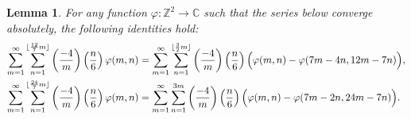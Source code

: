 \documentclass[11pt,reqno]{amsart}
\newtheorem{lemma}[theorem]{Lemma}
\renewcommand{\=}{\;=\;}
\theoremstyle{myremark}
\begin{document}
\begin{lemma} \label{lem:double_ser_trans}
For any function $\varphi:\mathbb{Z}^2 \rightarrow \mathbb{C}$ such that the series below converge absolutely, the following identities hold:
\begin{align}
\sum_{m=1}^\infty \sum_{n=1}^{\lfloor {12 \over 7}m \rfloor} \left({-4 \over m}\right) \left({n \over 6}\right) \varphi(m,n) &= \sum_{m=1}^\infty \sum_{n=1}^{\lfloor {3 \over 2}m \rfloor} \left({-4 \over m}\right) \left({n \over 6}\right) \Big( \varphi(m,n) - \varphi(7m-4n,12m-7n) \Big), \label{eqn:double_ser_trans1} \\
\sum_{m=1}^\infty \sum_{n=1}^{\lfloor {24 \over 7}m \rfloor} \left({-4 \over m}\right) \left({n \over 6}\right) \varphi(m,n) &= \sum_{m=1}^\infty \sum_{n=1}^{3m} \left({-4 \over m}\right) \left({n \over 6}\right) \Big( \varphi(m,n) - \varphi(7m-2n,24m-7n) \Big). \label{eqn:double_ser_trans2}
\end{align}
\end{lemma}
\end{document}
